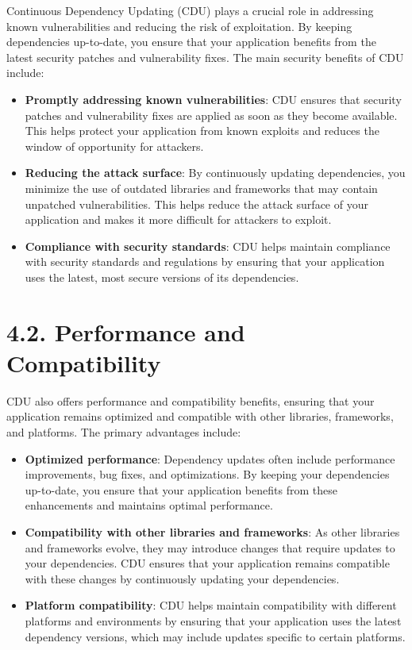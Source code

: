 \documentclass[10pt]{article}
\begin{document}
Continuous Dependency Updating (CDU) plays a crucial role in addressing known vulnerabilities and reducing the risk of exploitation. By keeping dependencies up-to-date, you ensure that your application benefits from the latest security patches and vulnerability fixes. The main security benefits of CDU include:

\begin{itemize}

  \item \textbf{Promptly addressing known vulnerabilities}: CDU ensures that security patches and vulnerability fixes are applied as soon as they become available. This helps protect your application from known exploits and reduces the window of opportunity for attackers.

  \item \textbf{Reducing the attack surface}: By continuously updating dependencies, you minimize the use of outdated libraries and frameworks that may contain unpatched vulnerabilities. This helps reduce the attack surface of your application and makes it more difficult for attackers to exploit.

  \item \textbf{Compliance with security standards}: CDU helps maintain compliance with security standards and regulations by ensuring that your application uses the latest, most secure versions of its dependencies.

\end{itemize}

\section*{4.2. Performance and Compatibility}

CDU also offers performance and compatibility benefits, ensuring that your application remains optimized and compatible with other libraries, frameworks, and platforms. The primary advantages include:

\begin{itemize}

  \item \textbf{Optimized performance}: Dependency updates often include performance improvements, bug fixes, and optimizations. By keeping your dependencies up-to-date, you ensure that your application benefits from these enhancements and maintains optimal performance.

  \item \textbf{Compatibility with other libraries and frameworks}: As other libraries and frameworks evolve, they may introduce changes that require updates to your dependencies. CDU ensures that your application remains compatible with these changes by continuously updating your dependencies.

  \item \textbf{Platform compatibility}: CDU helps maintain compatibility with different platforms and environments by ensuring that your application uses the latest dependency versions, which may include updates specific to certain platforms.

\end{itemize}
\end{document}
